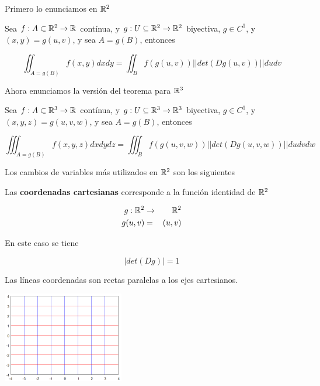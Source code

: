 Primero lo enunciamos en $\mathbb{R}^2$

\begin{theorem} 
Sea $f : A \subset \mathbb{R}^2 \to \mathbb{R}$ contínua, y $g : U \subseteq \mathbb{R}^2 \to \mathbb{R}^2$ biyectiva, $g \in C^1$, y $(x,y) = g(u,v)$, y sea $ A = g(B)$, entonces

$$ \displaystyle \iint_{A=g(B)} f(x,y) dxdy = \iint_{B} f(g(u,v)) ||det(Dg(u,v))|| dudv $$
\end{theorem}

Ahora enunciamos la versión del teorema para $\mathbb{R}^3$

\begin{theorem}
Sea $f : A \subset \mathbb{R}^3 \to \mathbb{R}$ contínua, y $g : U \subseteq \mathbb{R}^3 \to \mathbb{R}^3$ biyectiva, $g \in C^1$, y $(x,y,z) = g(u,v,w)$, y sea $ A = g(B)$, entonces

$$ \displaystyle \iiint_{A=g(B)} f(x,y,z) dxdydz = \iiint_{B} f(g(u,v,w)) ||det(Dg(u,v,w))|| dudvdw $$

\end{theorem}

Los cambios de variables más utilizados en $\mathbb{R}^2$ son los siguientes

\begin{definition}[Cartesianas]
Las \textbf{coordenadas cartesianas} corresponde a la función identidad de $\mathbb{R}^2$

\begin{eqnarray*} g: \mathbb{R}^2 &\to& \mathbb{R}^2 \\
 g(u,v) &=& (u,v) \end{eqnarray*}

En este caso se tiene

$$ |det(Dg)| = 1 $$

Las líneas coordenadas son rectas paralelas a los ejes cartesianos.

\begin{center}
\includegraphics{images/04_analisis2/coord_cart2d.png}
\end{center}
\end{definition}

